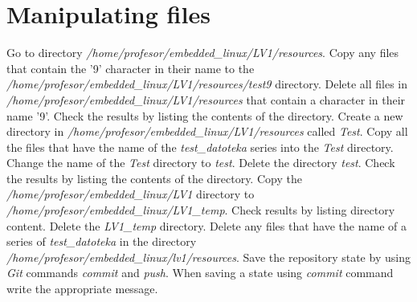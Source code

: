 \documentclass[11pt]{article}
\begin{document}
\section{Manipulating files}
Go to directory \textit{/home/profesor/embedded\_linux/LV1/resources}.
 Copy any files that contain the '9' character in their name to the \\
 \textit{/home/profesor/embedded\_linux/LV1/resources/test9} directory. Delete all
 files in \textit{/home/profesor/embedded\_linux/LV1/resources} that contain a
 character in their name '9'. Check the results by listing the contents of the
 directory.
\newline
\newline
Create a new directory in \textit{/home/profesor/embedded\_linux/LV1/resources}
 called \textit{Test}. Copy all the files that have the name of the
 \textit{test\_datoteka} series into the \textit{Test} directory. Change the
 name of the \textit{Test} directory to \textit{test}. Delete the directory
 \textit{test}. Check the results by listing the contents of the directory.
\newline
\newline
Copy the \textit{/home/profesor/embedded\_linux/LV1} directory to \\
\textit{/home/profesor/embedded\_linux/LV1\_temp}. Check results by listing
 directory content. Delete the \textit{LV1\_temp} directory.
\newline
\newline
Delete any files that have the name of a series of \textit{test\_datoteka} in
 the directory \textit{/home/profesor/embedded\_linux/lv1/resources}.
\newline
\newline
Save the repository state by using \textit{Git} commands \textit{commit} and
 \textit{push}. When saving a state using \textit{commit} command write the
 appropriate message.
\end{document}
